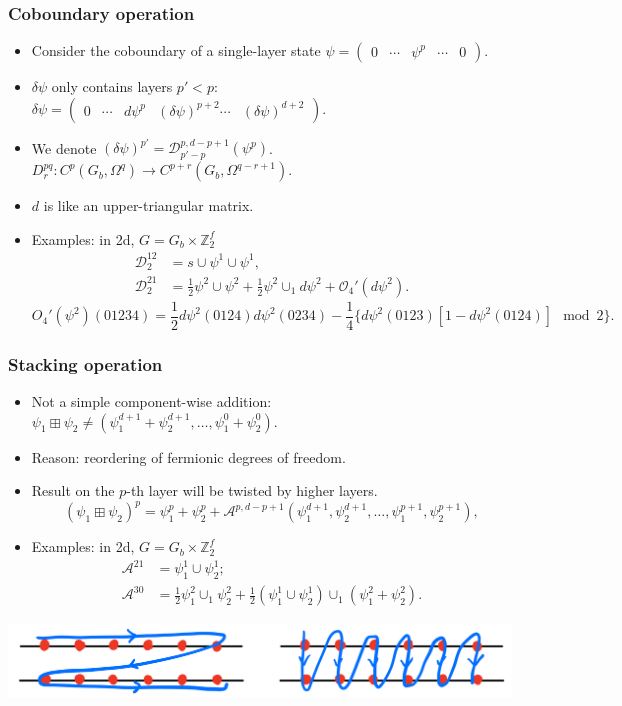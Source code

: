 \documentclass[xcolor=table, aspectratio=169]{beamer}
\begin{document}
\begin{frame}
	\frametitle{Coboundary operation}
	\begin{itemize}
		\item Consider the coboundary of a single-layer state
		$\psi = \begin{pmatrix}0&\cdots&\psi^p&\cdots&0\end{pmatrix}$.
		\item $\delta\psi$ only contains layers $p'<p$:
		$\delta\psi=\begin{pmatrix}0&\cdots&d\psi^p&(\delta\psi)^{p+2}\cdots&(\delta\psi)^{d+2}\end{pmatrix}$.
		\item We denote $(\delta\psi)^{p'}=\mathcal D^{p, d-p+1}_{p'-p}(\psi^p)$.
		$D^{pq}_r:C^p(G_b,\Omega^q)\rightarrow C^{p+r}(G_b,\Omega^{q-r+1})$.
		\item $d$ is like an upper-triangular matrix.
		\item Examples: in 2d, $G=G_b\times\mathbb Z_2^f$
		\begin{align*}
			\mathcal D_2^{12} &= s\cup\psi^1\cup\psi^1,\\
		  \mathcal D_2^{21} &= \frac12\psi^2\cup\psi^2
		  +\frac12\psi^2\cup_1d\psi^2
		  +\mathcal O_4'(d\psi^2).
		\end{align*}
		\[  O_4'(\psi^2)(01234)
		  =\frac12d\psi^2(0124)d\psi^2(0234)
		  -\frac14\{d\psi^2(0123)[1-d\psi^2(0124)] \mod 2\}.\]
	\end{itemize}
\end{frame}

\begin{frame}
	\frametitle{Stacking operation}
	\begin{itemize}
		\item Not a simple component-wise addition:
		$\psi_1\boxplus\psi_2\neq (\psi_1^{d+1}+\psi_2^{d+1},\ldots,\psi_1^0+\psi_2^0)$.
		\item Reason: reordering of fermionic degrees of freedom.
		\item Result on the $p$-th layer will be twisted by higher layers.
		\[(\psi_1\boxplus\psi_2)^p = \psi_1^p + \psi_2^p
    + \mathcal A^{p,d-p+1}(\psi_1^{d+1},\psi_2^{d+1},\ldots,\psi_1^{p+1}, \psi_2^{p+1}),\]
		\item Examples: in 2d, $G=G_b\times\mathbb Z_2^f$
		\begin{align*}
		  \mathcal A^{21} &= \psi^1_1\cup\psi^1_2;\\
		  \mathcal A^{30} &= \frac12\psi^2_1\cup_1\psi^2_2 + \frac12 (\psi^1_1\cup\psi^1_2)\cup_1(\psi^2_1+\psi^2_2).
		\end{align*}
	\end{itemize}
	\begin{center}
		\includegraphics[height=2cm]{forder}
	\end{center}
\end{frame}
\end{document}
